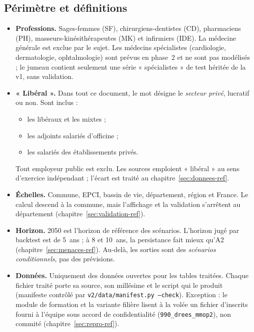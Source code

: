 \subsection{Périmètre et définitions}\label{int:perimetre}
\begin{itemize}
\item \textbf{Professions.} Sages-femmes (SF), chirurgiens-dentistes (CD), pharmaciens (PH),
  masseurs-kinésithérapeutes (MK) et infirmiers (IDE). La médecine générale est exclue par le sujet. Les médecins
  spécialistes (cardiologie, dermatologie, ophtalmologie) sont prévus en phase~2 et ne sont pas modélisés ; le
  jumeau contient seulement une série « spécialistes » de test héritée de la v1, sans validation.
\item \textbf{« Libéral ».} Dans tout ce document, le mot désigne le \emph{secteur privé}, lucratif ou non. Sont
  inclus :
  \begin{itemize}
  \item les libéraux et les mixtes ;
  \item les adjoints salariés d'officine ;
  \item les salariés des établissements privés.
  \end{itemize}
  Tout employeur public est exclu. Les sources emploient « libéral » au sens d'exercice indépendant ; l'écart est
  traité au chapitre~\ref{sec:donnees-ref}.
\item \textbf{Échelles.} Commune, EPCI, bassin de vie, département, région et France. Le calcul descend à la
  commune, mais l'affichage et la validation s'arrêtent au département (chapitre~\ref{sec:validation-ref}).
\item \textbf{Horizon.} 2050 est l'horizon de référence des scénarios. L'horizon jugé par backtest est de
  5~ans ; à 8 et 10~ans, la persistance fait mieux qu'A2\mesure{} (chapitre~\ref{sec:menaces-ref}). Au-delà, les
  sorties sont des \emph{scénarios conditionnels}, pas des prévisions.
\item \textbf{Données.} Uniquement des données ouvertes pour les tables traitées. Chaque fichier traité porte sa
  source, son millésime et le script qui le produit (manifeste contrôlé par \texttt{v2/data/manifest.py --check}).
  Exception : le module de formation et la variante filière lisent à la volée un fichier d'inscrits fourni à
  l'équipe sous accord de confidentialité (\texttt{990\_drees\_mmop2}), non commité
  (chapitre~\ref{sec:repro-ref}).
\end{itemize}

